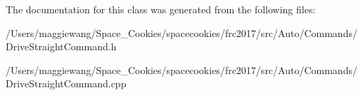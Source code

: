 The documentation for this class was generated from the following files\+:\begin{DoxyCompactItemize}
\item 
/\+Users/maggiewang/\+Space\+\_\+\+Cookies/spacecookies/frc2017/src/\+Auto/\+Commands/Drive\+Straight\+Command.\+h\item 
/\+Users/maggiewang/\+Space\+\_\+\+Cookies/spacecookies/frc2017/src/\+Auto/\+Commands/Drive\+Straight\+Command.\+cpp\end{DoxyCompactItemize}
